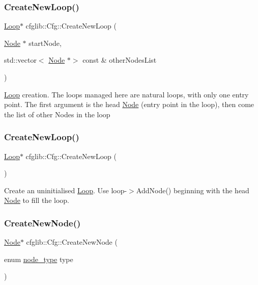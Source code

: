 \subsubsection{\texorpdfstring{Create\+New\+Loop()}{CreateNewLoop()}\hspace{0.1cm}{\footnotesize\ttfamily [1/2]}}
{\footnotesize\ttfamily \hyperlink{classcfglib_1_1Loop}{Loop}$\ast$ cfglib\+::\+Cfg\+::\+Create\+New\+Loop (\begin{DoxyParamCaption}\item[{\hyperlink{classcfglib_1_1Node}{Node} $\ast$}]{start\+Node,  }\item[{std\+::vector$<$ \hyperlink{classcfglib_1_1Node}{Node} $\ast$$>$ const \&}]{other\+Nodes\+List }\end{DoxyParamCaption})}

\hyperlink{classcfglib_1_1Loop}{Loop} creation. The loops managed here are natural loops, with only one entry point. The first argument is the head \hyperlink{classcfglib_1_1Node}{Node} (entry point in the loop), then come the list of other Nodes in the loop \mbox{\label{classcfglib_1_1Cfg_af8e183cfc272143b47dc856f8f368627}} 
\subsubsection{\texorpdfstring{Create\+New\+Loop()}{CreateNewLoop()}\hspace{0.1cm}{\footnotesize\ttfamily [2/2]}}
{\footnotesize\ttfamily \hyperlink{classcfglib_1_1Loop}{Loop}$\ast$ cfglib\+::\+Cfg\+::\+Create\+New\+Loop (\begin{DoxyParamCaption}{ }\end{DoxyParamCaption})}

Create an uninitialised \hyperlink{classcfglib_1_1Loop}{Loop}. Use loop-\/$>$Add\+Node() beginning with the head \hyperlink{classcfglib_1_1Node}{Node} to fill the loop. \mbox{\label{classcfglib_1_1Cfg_a023e8fe06cf55bfecf3c1f4a3ddb3f99}} 
\subsubsection{\texorpdfstring{Create\+New\+Node()}{CreateNewNode()}}
{\footnotesize\ttfamily \hyperlink{classcfglib_1_1Node}{Node}$\ast$ cfglib\+::\+Cfg\+::\+Create\+New\+Node (\begin{DoxyParamCaption}\item[{enum \hyperlink{namespacecfglib_a44952a45d827aaa271f7e7dac5bf7752}{node\+\_\+type}}]{type }\end{DoxyParamCaption})}

